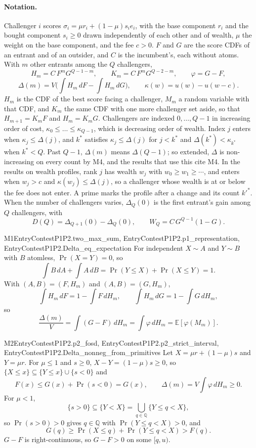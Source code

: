 \paragraph{Notation.} Challenger $i$ scores $\sigma_i=\mu r_i+(1-\mu)s_ie_i$, with
the base component $r_i$ and the bought component $s_i\ge0$ drawn independently
of each other and of wealth, $\mu$ the weight on the base component, and the fee
$c>0$. $F$ and $G$ are the score CDFs
of an entrant and of an outsider, and $C$ is the incumbent's, each without atoms.
With $m$ other entrants among the $Q$ challengers,
\[
  H_m=C\,F^{m}G^{Q-1-m},\qquad K_m=C\,F^{m}G^{Q-2-m},\qquad \varphi=G-F,
\]
\[
  \Delta(m)=V\Big(\int H_m\,dF-\int H_m\,dG\Big),\qquad \kappa(w)=u(w)-u(w-c).
\]
$H_m$ is the CDF of the best score facing a challenger, $M_m$ a random variable
with that CDF, and $K_m$ the same CDF with one more challenger set aside, so that
$H_{m+1}=K_mF$ and $H_m=K_mG$.
Challengers are indexed $0,\dots,Q-1$ in increasing order of cost,
$\kappa_0\le\dots\le\kappa_{Q-1}$, which is decreasing order of wealth. Index $j$
enters when $\kappa_j\le\Delta(j)$, and $k^*$ satisfies $\kappa_j\le\Delta(j)$ for
$j<k^*$ and $\Delta(k^*)<\kappa_{k^*}$ when $k^*<Q$. Past $Q-1$, $\Delta(m)$ means
$\Delta(Q-1)$; so extended, $\Delta$ is non-increasing on every count by M4, and
the results that use this cite M4. In the results on wealth
profiles, rank $j$ has wealth $w_j$ with $w_0\ge w_1\ge\cdots$, and enters when
$w_j>c$ and $\kappa(w_j)\le\Delta(j)$, so a challenger whose wealth is at or below
the fee does not enter. A prime marks the profile after a change and its count
$k'^*$. When the number of challengers varies, $\Delta_Q(0)$ is the first
entrant's gain among $Q$ challengers, with
\[
  D(Q)=\Delta_{Q+1}(0)-\Delta_Q(0),\qquad W_Q=C\,G^{Q-1}(1-G).
\]

\begin{mproof}{M1}{EntryContestP1P2.two_max_sum, EntryContestP1P2.p1_representation, EntryContestP1P2.Delta_eq_expectation}
For independent $X\sim A$ and $Y\sim B$ with $B$ atomless, $\Pr(X=Y)=0$, so
\[
  \int B\,dA+\int A\,dB=\Pr(Y\le X)+\Pr(X\le Y)=1 .
\]
With $(A,B)=(F,H_m)$ and $(A,B)=(G,H_m)$,
\[
  \int H_m\,dF=1-\int F\,dH_m,\qquad \int H_m\,dG=1-\int G\,dH_m ,
\]
so
\[
  \frac{\Delta(m)}{V}=\int (G-F)\,dH_m=\int\varphi\,dH_m=\mathbb E[\varphi(M_m)] .
\]
\end{mproof}

\begin{mproof}{M2}{EntryContestP1P2.p2_fosd, EntryContestP1P2.p2_strict_interval, EntryContestP1P2.Delta_nonneg_from_primitives}
Let $X=\mu r+(1-\mu)s$ and $Y=\mu r$. For $\mu\le1$ and $s\ge0$, $X-Y=(1-\mu)s\ge0$,
so $\{X\le x\}\subseteq\{Y\le x\}\cup\{s<0\}$ and
\[
  F(x)\le G(x)+\Pr(s<0)=G(x),\qquad \Delta(m)=V\!\int\varphi\,dH_m\ge0 .
\]
For $\mu<1$,
\[
  \{s>0\}\subseteq\{Y<X\}=\bigcup_{q\in\mathbb Q}\{Y\le q<X\},
\]
so $\Pr(s>0)>0$ gives $q\in\mathbb Q$ with $\Pr(Y\le q<X)>0$, and
\[
  G(q)\ge\Pr(X\le q)+\Pr(Y\le q<X)>F(q).
\]
$G-F$ is right-continuous, so $G-F>0$ on some $[q,u)$.
\end{mproof}


